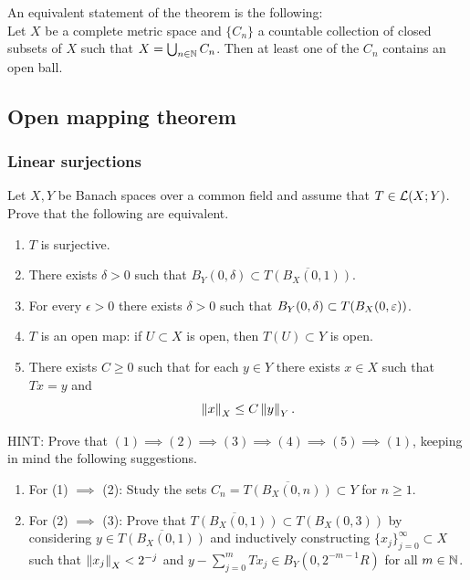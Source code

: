 \documentclass[a4paper]{article}
\begin{document}
\begin{remark}
    An equivalent statement of the theorem is the following: \\
    Let $X$ be a complete metric space and $\{C_n\}$ a countable
    collection of closed subsets of $X$ such that $X =
    \bigcup_{n \in \mathbb{N}} C_n $. Then at least one of the $C_n$
    contains an open ball.
\end{remark}

\subsection{Open mapping theorem}

\subsubsection*{Linear surjections}

\begin{thm}
Let $X,Y$ be Banach spaces over a common field and assume that
$T \in \mathcal{L}(X;Y)$.  Prove that the following are equivalent.
\begin{enumerate}
 \item $T$ is surjective.

 \item There exists $\delta >0$ such that $B_Y(0,\delta) \subset
 \overline{T(B_X(0,1))}$.

 \item For every $\epsilon >0$ there exists $\delta >0$
 such that $B_Y(0,\delta) \subset T(B_X(0,\varepsilon))$.

 \item $T$ is an open map: if $U\subset X$ is open, then
 $T(U) \subset Y$ is open.

  \item There exists $C \ge 0$ such that for each $y \in Y$
  there exists $x \in X$ such that $Tx=y$ and
\begin{equation*}
 \left\lVert x\right\rVert_X \le C \left\lVert y\right\rVert_Y.
\end{equation*}
\end{enumerate}
HINT: Prove that  $(1) \implies (2) \implies (3)
\implies (4) \implies (5)  \implies (1)$, keeping
in mind the following suggestions.
\begin{enumerate}
 \item For (1) $\implies$ (2): Study the sets $C_n =
 \overline{T(B_X(0,n))} \subset Y$ for $n \ge 1$.
 \item For (2) $\implies$ (3):  Prove that
 $\overline{T(B_X(0,1)  )} \subset T(B_X(0,3))$
 by considering $y \in\overline{T(B_X(0,1)  )}$ and
 inductively constructing $\{x_j\}_{j=0}^\infty \subset X$
such that $\left\lVert x_j\right\rVert_X < 2^{-j}$ and
$y - \sum_{j=0}^m T x_j \in B_Y(0,2^{-m-1} R)$
for all $m \in \mathbb{N}$.
\end{enumerate}
\end{thm}
\end{document}
